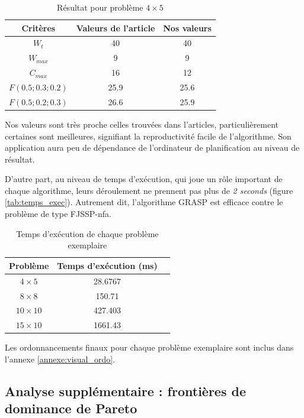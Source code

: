 \documentclass[10pt,a4paper]{scrartcl}
\begin{document}
\begin{table}[!h]
  \centering
  \begin{tabular}{|c|c|c|}
    \hline
    Critères & Valeurs de l'article & Nos valeurs \\
    \hline
    $W_t$ & 40 & 40 \\
    $W_{max}$ & 9 & 9 \\
    $C_{max}$ & 16 & 12 \\
    $F(0.5;0.3;0.2)$ & 25.9 & 25.6 \\
    $F(0.5;0.2;0.3)$ & 26.6 & 25.9 \\
    \hline
  \end{tabular}
  \caption{Résultat pour problème $4 \times 5$}
\end{table}

Nos valeurs sont très proche celles trouvées dans l'articles, particulièrement certaines sont meilleures, signifiant la reproductivité facile de l'algorithme. Son application aura peu de dépendance de l'ordinateur de planification au niveau de résultat.

D'autre part, au niveau de temps d'exécution, qui joue un rôle important de chaque algorithme, leurs déroulement ne prennent pas plus de \emph{2 seconds} (figure \eqref{tab:temps_exec}). Autrement dit, l'algorithme GRASP est efficace contre le problème de type FJSSP-nfa.

\begin{table}[!h]
  \centering
  \begin{tabular}{|c|c|c|}
    \hline
    Problème & Temps d'exécution (ms) \\
    \hline
    $4 \times 5$ & 28.6767 \\
    $8 \times 8$ & 150.71 \\
    $10 \times 10$ & 427.403 \\
    $15 \times 10$ & 1661.43 \\
    \hline
  \end{tabular}
  \caption{Temps d'exécution de chaque problème exemplaire}
  \label{tab:temps_exec}
\end{table}

Les ordonnancements finaux pour chaque problème exemplaire sont inclus dans l'annexe \eqref{annexe:visual_ordo}.

\subsection{Analyse supplémentaire : frontières de dominance de Pareto}
\end{document}
